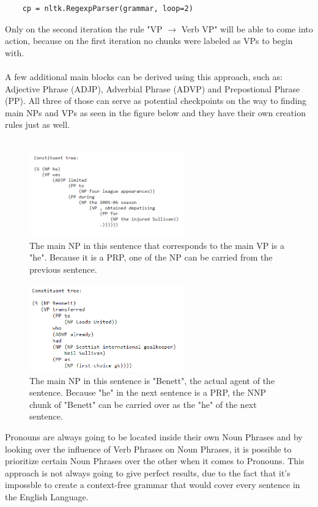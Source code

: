 \documentclass{article}
\begin{document}
\begin{verbatim}
    cp = nltk.RegexpParser(grammar, loop=2)
\end{verbatim}
Only on the second iteration the rule "VP $\rightarrow$ Verb VP" will be able to come into action, because on the first iteration no chunks were labeled as VPs to begin with. \\ \\
A few additional main blocks can be derived using this approach, such as: Adjective Phrase (ADJP), Adverbial Phrase (ADVP) and Prepostional Phrase (PP)\cite{CFG for PP etc.}. All three of those can serve as potential checkpoints on the way to finding main NPs and VPs as seen in the figure below and they have their own creation rules just as well. \\ \\
\begin{figure}[h]
    \centering
\includegraphics[width=0.6\textwidth]{NPsvsVPs.png}
    \caption{The main NP in this sentence that corresponds to the main VP is a "he". Because it is a PRP, one of the NP can be carried from the previous sentence.}
\end{figure}
\begin{figure}[h]
    \centering
\includegraphics[width=0.6\textwidth]{NPsvsVPs2.png}
    \caption{The main NP in this sentence is "Benett", the actual agent of the sentence. Because "he" in the next sentence is a PRP, the NNP chunk of "Benett" can be carried over as the "he" of the next sentence.}
\end{figure}
Pronouns are always going to be located inside their own Noun Phrases and by looking over the influence of Verb Phrases on Noun Phrases, it is possible to prioritize certain Noun Phrases over the other when it comes to Pronouns. This approach is not always going to give perfect results, due to the fact that it's impossble to create a context-free grammar that would cover every sentence in the English Language. \\ \\
\end{document}
